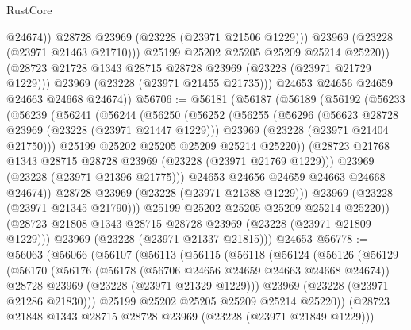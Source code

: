 \begin{lexlean}{RustCore}
\begin{coremodule}
                      @24674))
                  @28728
                  @23969
                  (@23228 (@23971 @21506 @1229)))
                @23969
                (@23228 (@23971 @21463 @21710)))
              @25199
              @25202
              @25205
              @25209
              @25214
              @25220))
          (@28723 @21728 @1343 @28715 @28728 @23969 (@23228 (@23971 @21729 @1229)))
          @23969
          (@23228 (@23971 @21455 @21735)))
        @24653
        @24656
        @24659
        @24663
        @24668
        @24674))
@56706 := @56181
    (@56187
      (@56189
        (@56192
          (@56233
            (@56239
              (@56241
                (@56244
                  (@56250
                    (@56252
                      (@56255
                        (@56296
                          (@56623 @28728 @23969 (@23228 (@23971 @21447 @1229)))
                          @23969
                          (@23228 (@23971 @21404 @21750)))
                        @25199
                        @25202
                        @25205
                        @25209
                        @25214
                        @25220))
                    (@28723 @21768 @1343 @28715 @28728 @23969 (@23228 (@23971 @21769 @1229)))
                    @23969
                    (@23228 (@23971 @21396 @21775)))
                  @24653
                  @24656
                  @24659
                  @24663
                  @24668
                  @24674))
              @28728
              @23969
              (@23228 (@23971 @21388 @1229)))
            @23969
            (@23228 (@23971 @21345 @21790)))
          @25199
          @25202
          @25205
          @25209
          @25214
          @25220))
      (@28723 @21808 @1343 @28715 @28728 @23969 (@23228 (@23971 @21809 @1229)))
      @23969
      (@23228 (@23971 @21337 @21815)))
    @24653
@56778 := @56063
    (@56066
      (@56107
        (@56113
          (@56115
            (@56118
              (@56124
                (@56126
                  (@56129
                    (@56170
                      (@56176
                        (@56178 (@56706 @24656 @24659 @24663 @24668 @24674))
                        @28728
                        @23969
                        (@23228 (@23971 @21329 @1229)))
                      @23969
                      (@23228 (@23971 @21286 @21830)))
                    @25199
                    @25202
                    @25205
                    @25209
                    @25214
                    @25220))
                (@28723 @21848 @1343 @28715 @28728 @23969 (@23228 (@23971 @21849 @1229)))

\end{coremodule}
\end{lexlean}
